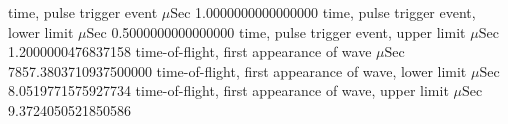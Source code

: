 \expandafter\def\csname oct2tex.alucyl_d50_v800_P.t0.d\endcsname{time, pulse trigger event}
\expandafter\def\csname oct2tex.alucyl_d50_v800_P.t0.u\endcsname{\ensuremath{\mu\text{Sec}}}
\expandafter\def\csname oct2tex.alucyl_d50_v800_P.t0.v\endcsname{1.0000000000000000}
\expandafter\def\csname oct2tex.alucyl_d50_v800_P.t0a.d\endcsname{time, pulse trigger event, lower limit}
\expandafter\def\csname oct2tex.alucyl_d50_v800_P.t0a.u\endcsname{\ensuremath{\mu\text{Sec}}}
\expandafter\def\csname oct2tex.alucyl_d50_v800_P.t0a.v\endcsname{0.5000000000000000}
\expandafter\def\csname oct2tex.alucyl_d50_v800_P.t0b.d\endcsname{time, pulse trigger event, upper limit}
\expandafter\def\csname oct2tex.alucyl_d50_v800_P.t0b.u\endcsname{\ensuremath{\mu\text{Sec}}}
\expandafter\def\csname oct2tex.alucyl_d50_v800_P.t0b.v\endcsname{1.2000000476837158}
\expandafter\def\csname oct2tex.alucyl_d50_v800_P.t1.d\endcsname{time-of-flight, first appearance of wave}
\expandafter\def\csname oct2tex.alucyl_d50_v800_P.t1.u\endcsname{\ensuremath{\mu\text{Sec}}}
\expandafter\def\csname oct2tex.alucyl_d50_v800_P.t1.v\endcsname{7857.3803710937500000}
\expandafter\def\csname oct2tex.alucyl_d50_v800_P.t1a.d\endcsname{time-of-flight, first appearance of wave, lower limit}
\expandafter\def\csname oct2tex.alucyl_d50_v800_P.t1a.u\endcsname{\ensuremath{\mu\text{Sec}}}
\expandafter\def\csname oct2tex.alucyl_d50_v800_P.t1a.v\endcsname{8.0519771575927734}
\expandafter\def\csname oct2tex.alucyl_d50_v800_P.t1b.d\endcsname{time-of-flight, first appearance of wave, upper limit}
\expandafter\def\csname oct2tex.alucyl_d50_v800_P.t1b.u\endcsname{\ensuremath{\mu\text{Sec}}}
\expandafter\def\csname oct2tex.alucyl_d50_v800_P.t1b.v\endcsname{9.3724050521850586}
